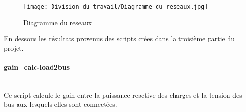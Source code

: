 \documentclass[a4paper,twoside]{article}
\begin{document}
\begin{figure}[H]
	\begin{center}	
		\texttt{[image: Division\_du\_travail/Diagramme\_du\_reseaux.jpg]}
		\caption{Diagramme du reseaux}
		\label{fig:Diagramme_du_reseaux}
	\end{center}
\end{figure}
\pagebreak

En dessous les résultats provenus des scripts crées dans la troisième partie du projet. 
\paragraph{gain\_calc-load2bus\\\\}
Ce script calcule le gain entre la puissance reactive des charges et la tension des bus aux lesquels elles sont connectées.
\end{document}
